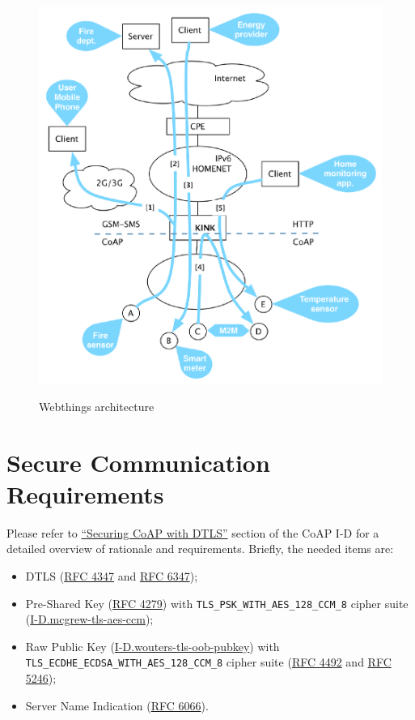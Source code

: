 \documentclass[10pt]{article}
\begin{document}
\begin{figure}
  \centering
  \includegraphics[width=12cm,height=13cm]{../share/images/kink-homenet}
    \caption{Webthings architecture}
    \label{fig:arch}
\end{figure}

\section{Secure Communication Requirements}

Please refer to \href{http://tools.ietf.org/html/draft-ietf-core-coap-08#section-10.1}{``Securing CoAP with DTLS''} section of the CoAP I-D for a detailed overview of rationale and requirements.  Briefly, the needed items are:

\begin{itemize}
\item DTLS (\href{http://tools.ietf.org/html/rfc4347}{RFC 4347} and \href{http://tools.ietf.org/html/rfc6347}{RFC 6347});
\item Pre-Shared Key (\href{http://tools.ietf.org/html/rfc4279}{RFC 4279}) with \texttt{TLS\_PSK\_WITH\_AES\_128\_CCM\_8} cipher suite (\href{http://tools.ietf.org/html/draft-mcgrew-tls-aes-ccm-ecc-02}{I-D.mcgrew-tls-aes-ccm});
\item Raw Public Key (\href{http://tools.ietf.org/html/draft-wouters-tls-oob-pubkey}{I-D.wouters-tls-oob-pubkey}) with \texttt{TLS\_ECDHE\_ECDSA\_WITH\_AES\_128\_CCM\_8} cipher suite (\href{http://tools.ietf.org/html/rfc4492}{RFC 4492} and \href{http://tools.ietf.org/html/rfc5246}{RFC 5246});
\item Server Name Indication (\href{http://tools.ietf.org/html/rfc6066}{RFC 6066}).
\end{itemize}
\end{document}
